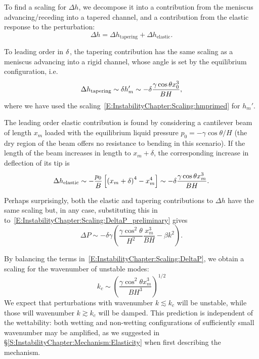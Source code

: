 To find a scaling for $\Delta h$, we decompose it into a contribution from the meniscus advancing/receding into a tapered channel, and a contribution from the elastic response to the perturbation:
\begin{equation}\label{E:InstabilityChapter:Scaling:ChangeInH}
\Delta h = \Delta h_\text{tapering} + \Delta h_\text{elastic}.
\end{equation}

To leading order in $\delta$, the tapering contribution has the same scaling as a meniscus advancing into a rigid channel, whose angle is set by the equilibrium configuration, i.e.
\begin{equation}\label{E:InstabilityChapter:Scaling:ChangeInHtapering}
\Delta h_\text{tapering} \sim \delta h_m' \sim -\delta \frac{\gamma  \cos \theta x_0^3}{B H},
\end{equation}
where we have used the scaling~\eqref{E:InstabilityChapter:Scaling:hmprimed} for $h_m'$.

The leading order elastic contribution is found by considering a cantilever beam of length $x_m$ loaded with the equilibrium liquid pressure $p_0 = -\gamma \cos \theta/H$ (the dry region of the beam offers no resistance to bending in this scenario). If the length of the beam increases in length to $x_m + \delta$, the corresponding increase in deflection of its tip is
\begin{equation}\label{E:InstabilityChapter:Scaling:ChangeInHelastic}
\Delta h_\text{elastic} \sim -\frac{p_0}{B}\left[ \left(x_m + \delta\right)^4 - x_m^4\right] \sim  -\delta \frac{\gamma \cos \theta x_m^3}{BH}.
\end{equation}

Perhaps surprisingly, both the elastic and tapering contributions to $\Delta h$ have the same scaling but, in any case, substituting this in to~\eqref{E:InstabilityChapter:Scaling:DeltaP_preliminary} gives
\begin{equation}\label{E:InstabilityChapter:Scaling:DeltaP}
\Delta P \sim -\delta \gamma \left(\frac{\gamma \cos^2 \theta}{H^2}\frac{ x_m^3}{B H} - \beta k^2\right).
\end{equation}

By balancing the terms in~\eqref{E:InstabilityChapter:Scaling:DeltaP}, we obtain
a scaling for the wavenumber of unstable modes:
\begin{equation}\label{E:InstabilityChapter:Scaling:CriticalWavenumber}
k_c \sim  \left(\frac{\gamma \cos^2 \theta x_m^3}{B H^3}\right)^{1/2}
\end{equation}
We expect that perturbations with wavenumber $k \lesssim k_c$ will be unstable, while those will wavenumber $k \gtrsim k_c$ will be damped. This prediction is independent of the wettability: both wetting and non-wetting configurations of sufficiently small wavenumber may be amplified, as we suggested in \S\ref{S:InstabilityChapter:Mechanism:Elasticity} when first describing the mechanism.

